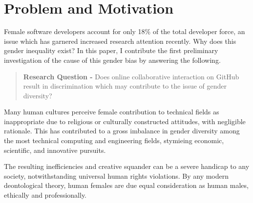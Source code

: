 \documentclass{sigplanconf}
\begin{document}

\section{Problem and Motivation}

Female software developers account for only 18\% of the total developer force,
an issue which has garnered increased research attention recently.
\citep{sherdiversity} Why does this gender inequality exist? In this paper, I
contribute the first preliminary investigation of the cause of this gender bias
by answering the following.

\begin{quote}
  \textbf{Research Question -} Does online collaborative interaction on GitHub result in
  discrimination which may contribute to the issue of gender diversity?
\end{quote}

Many human cultures perceive female contribution to technical
fields as inappropriate due to religious or culturally constructed attitudes, with
negligible rationale. \citep{elamin2010saudiwomen} This has contributed to a gross imbalance in gender diversity among
the most technical computing and engineering fields, stymieing economic,
scientific, and innovative pursuits.

The resulting inefficiencies and creative
squander can be a severe handicap to any society, notwithstanding universal human rights
violations. By any modern deontological theory, human females are due equal
consideration as human males, ethically and professionally.
\end{document}
